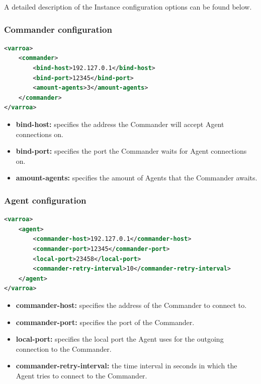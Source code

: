 A detailed description of the Instance configuration options can be found below.

\subsubsection{Commander configuration}\label{sec:commanderConfig}
\begin{lstlisting}[caption={Commander XML configuration example}, captionpos=b, label={lst:commanderConfig}, language=XML]
<varroa>
    <commander>
		<bind-host>192.127.0.1</bind-host>
        <bind-port>12345</bind-port>
        <amount-agents>3</amount-agents>
    </commander>
</varroa>
\end{lstlisting}
\begin{itemize}
	\item \textbf{bind-host:} specifies the address the Commander will accept Agent connections on.
	\item \textbf{bind-port:} specifies the port the Commander waits for Agent connections on.
	\item \textbf{amount-agents:} specifies the amount of Agents that the Commander awaits.
\end{itemize}

\subsubsection{Agent configuration}\label{sec:agentConfig}
\begin{lstlisting}[caption={Agent XML configuration example}, captionpos=b, label={lst:agentConfig}, language=XML]
<varroa>
    <agent>
		<commander-host>192.127.0.1</commander-host>
        <commander-port>12345</commander-port>
        <local-port>23458</local-port>
		<commander-retry-interval>10</commander-retry-interval>
    </agent>
</varroa>
\end{lstlisting}
\begin{itemize}
	\item \textbf{commander-host:} specifies the address of the Commander to connect to.
	\item \textbf{commander-port:} specifies the port of the Commander.
	\item \textbf{local-port:} specifies the local port the Agent uses for the outgoing connection to the Commander.
	\item \textbf{commander-retry-interval:} the time interval in seconds in which the Agent tries to connect to the Commander.
\end{itemize}

